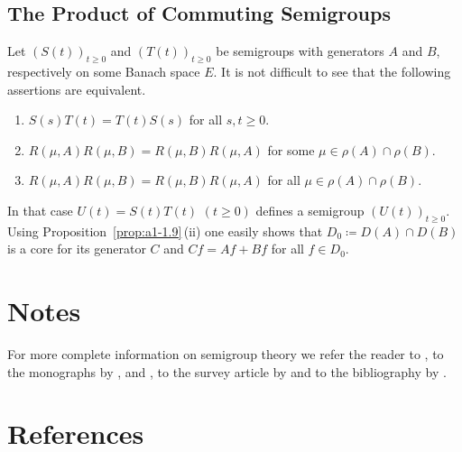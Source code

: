 \subsection{The Product of Commuting Semigroups}\label{subsec:a1-3.9}%
Let $(S(t))_{t\geq 0}$ and $(T(t))_{t\geq 0}$ be semigroups with generators $A$ and $B$, respectively on some Banach space $E$.
It is not difficult to see that the following assertions are equivalent.
\begin{enumerate}[\upshape (a)]

\item  
$S(s)T(t) = T(t)S(s)$ for all $s, t \geq 0$.

\item 
$R(\mu,A)R(\mu,B) = R(\mu,B)R(\mu,A)$ for some $\mu \in \rho(A) \cap \rho(B)$.

\item 
$R(\mu,A)R(\mu,B) = R(\mu,B)R(\mu,A)$ for all $\mu \in \rho(A) \cap \rho(B)$.

\end{enumerate}
In that case $U(t) = S(t)T(t)$ $(t \geq 0)$ defines a semigroup $(U(t))_{t\geq 0}$.
Using %
Proposition~\ref{prop:a1-1.9}\,(ii) one easily shows that $D_{0} \coloneq D(A) \cap D(B)$ is a core for its generator $C$ and $Cf = Af + Bf$ for all $f \in D_{0}$.
\section*{Notes}
For more complete information on semigroup theory we refer the reader to \textcite{hillephillips:1957}, to the monographs by \textcite{davies:1980}, 
\textcite{goldstein:1985a} and \textcite{pazy:1983}, to the survey article by \textcite{kreinkhazan:1985} and to the bibliography by 
\textcite{goldstein:1985b}. 
\section*{References}
{\RaggedRight
  \printbibliography[heading=none]
 }
